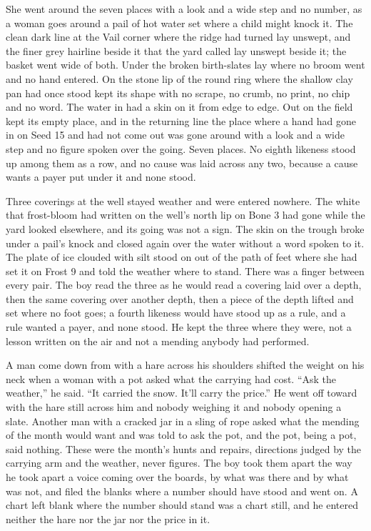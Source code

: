 She went around the seven places with a look and a wide step and no number, as a woman goes around a pail of hot water set where a child might knock it. The clean dark line at the Vail corner where the  ridge had turned lay unswept, and the finer grey hairline beside it that the yard called  lay unswept beside it; the basket went wide of both. Under  the broken birth-slates lay where no broom went and no hand entered. On the stone lip of  the round ring where the shallow clay pan had once stood kept its shape with no scrape, no crumb, no print, no chip and no word. The water in  had a skin on it from edge to edge. Out on  the field kept its empty place, and in the returning line the place where a hand had gone in on Seed 15 and had not come out was gone around with a look and a wide step and no figure spoken over the going. Seven places. No eighth likeness stood up among them as a row, and no cause was laid across any two, because a cause wants a payer put under it and none stood.

Three coverings at the well stayed weather and were entered nowhere. The white that frost-bloom had written on the well's north lip on Bone 3 had gone while the yard looked elsewhere, and its going was not a sign. The skin on the trough broke under a pail's knock and closed again over the water without a word spoken to it. The plate of ice clouded with silt stood on  out of the path of feet where she had set it on Frost 9 and told the weather where to stand. There was a finger between every pair. The boy read the three as he would read a covering laid over a depth, then the same covering over another depth, then a piece of the depth lifted and set where no foot goes; a fourth likeness would have stood up as a rule, and a rule wanted a payer, and none stood. He kept the three where they were, not a lesson written on the air and not a mending anybody had performed.

A man come down from  with a hare across his shoulders shifted the weight on his neck when a woman with a pot asked what the carrying had cost. “Ask the weather,” he said. “It carried the snow. It'll carry the price.” He went off toward  with the hare still across him and nobody weighing it and nobody opening a slate. Another man with a cracked jar in a sling of rope asked what the mending of the month would want and was told to ask the pot, and the pot, being a pot, said nothing. These were the month's hunts and repairs, directions judged by the carrying arm and the weather, never figures. The boy took them apart the way he took apart a voice coming over the boards, by what was there and by what was not, and filed the blanks where a number should have stood and went on. A chart left blank where the number should stand was a chart still, and he entered neither the hare nor the jar nor the price in it.

